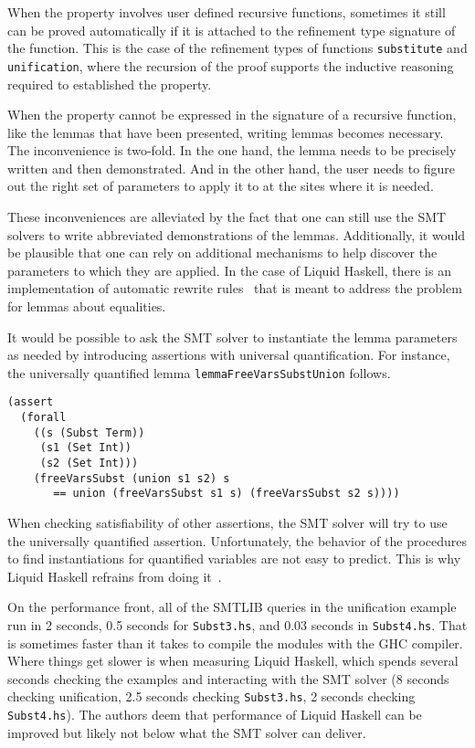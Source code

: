 \documentclass[sigconf, anonymous, review]{acmart}
\newcommand{\tc}[1]{{\small\texttt{#1}}}
\begin{document}
When the property involves user defined recursive functions,
sometimes it still can be proved automatically if it is attached to the
refinement type signature of the function. This is the case of the refinement
types of functions \tc{substitute} and \tc{unification}, where the recursion
of the proof supports the inductive reasoning required to established the
property.

When the property cannot be expressed in the signature of a recursive function,
like the lemmas that have been presented, writing lemmas becomes necessary. The
inconvenience is two-fold. In the one hand, the lemma needs to be precisely
written and then demonstrated. And in the other hand, the user needs to figure
out the right set of parameters to apply it to at the sites where it is needed.

These inconveniences are alleviated by the fact that one can still use the
SMT solvers to write abbreviated demonstrations of the lemmas. Additionally,
it would be plausible that one can rely on additional mechanisms to help
discover the parameters to which they are applied. In the case of Liquid
Haskell, there is an implementation of automatic rewrite rules~\cite{grannan22}
that is meant to address the problem for lemmas about equalities.

It would be possible to ask the SMT solver to instantiate the lemma parameters
as needed by introducing assertions with universal quantification. For instance,
the universally quantified lemma \tc{lemma\-FreeVars\-Subst\-Union} follows.

\begin{verbatim}
(assert
  (forall
    ((s (Subst Term))
     (s1 (Set Int))
     (s2 (Set Int)))
    (freeVarsSubst (union s1 s2) s
       == union (freeVarsSubst s1 s) (freeVarsSubst s2 s))))
\end{verbatim}

When checking satisfiability of other assertions, the SMT solver
will try to use the universally quantified assertion. Unfortunately, the
behavior of the procedures to find instantiations for quantified variables are
not easy to predict. This is why Liquid Haskell refrains from doing it~\cite{vazou13}.

On the performance front, all of the SMTLIB queries in the unification example run
in 2 seconds, 0.5 seconds for \tc{Subst3.hs}, and 0.03 seconds in \tc{Subst4.hs}.
That is sometimes faster than it takes to compile the modules with the GHC compiler.
Where things get slower is when measuring Liquid
Haskell, which spends several seconds checking the examples and interacting with the
SMT solver (8 seconds checking unification, 2.5 seconds checking \tc{Subst3.hs},
2 seconds checking \tc{Subst4.hs}). The authors deem that performance of Liquid Haskell
can be improved but likely not below what the SMT solver can deliver.
\end{document}
